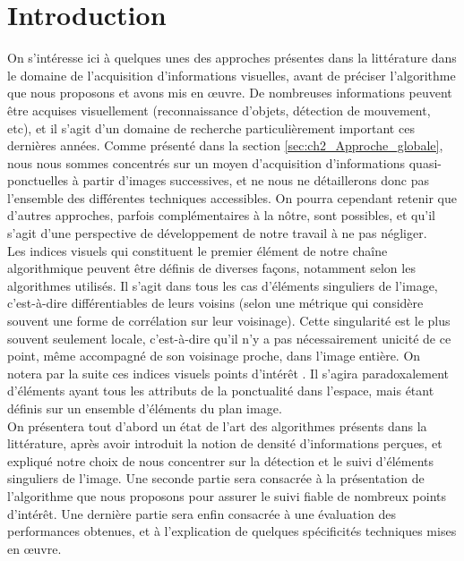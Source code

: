 \vspace{10pt}

\minitoc
\clearpage

\section{Introduction}
On s'intéresse ici à quelques unes des approches présentes dans la littérature dans le domaine de l'acquisition d'informations visuelles, avant de préciser l'algorithme que nous proposons et avons mis en œuvre. De nombreuses informations peuvent être acquises visuellement (reconnaissance d'objets, détection de mouvement, etc), et il s'agit d'un domaine de recherche particulièrement important ces dernières années. Comme présenté dans la section \ref{sec:ch2_Approche_globale}, nous nous sommes concentrés sur un moyen d'acquisition d'informations quasi-ponctuelles à partir d'images successives, et ne nous ne détaillerons donc pas l'ensemble des différentes techniques accessibles. On pourra cependant retenir que d'autres approches, parfois complémentaires à la nôtre, sont possibles, et qu'il s'agit d'une perspective de développement de notre travail à ne pas négliger.\\

Les indices visuels qui constituent le premier élément de notre chaîne algorithmique peuvent être définis de diverses façons, notamment selon les algorithmes utilisés. Il s'agit dans tous les cas d'éléments singuliers de l'image, c'est-à-dire différentiables de leurs voisins (selon une métrique qui considère souvent une forme de corrélation sur leur voisinage). Cette singularité est le plus souvent seulement locale, c'est-à-dire qu'il n'y a pas nécessairement unicité de ce point, même accompagné de son voisinage proche, dans l'image entière. On notera par la suite ces indices visuels \og points d'intérêt \fg{}. Il s'agira paradoxalement d'éléments ayant tous les attributs de la ponctualité dans l'espace, mais étant définis sur un ensemble d'éléments du plan image. \\
On présentera tout d'abord un état de l'art des algorithmes présents dans la littérature, après avoir introduit la notion de densité d'informations perçues, et expliqué notre choix de nous concentrer sur la détection et le suivi d'éléments singuliers de l'image. Une seconde partie sera consacrée à la présentation de l'algorithme que nous proposons pour assurer le suivi fiable de nombreux points d'intérêt. Une dernière partie sera enfin consacrée à une évaluation des performances obtenues, et à l'explication de quelques spécificités techniques mises en œuvre.

